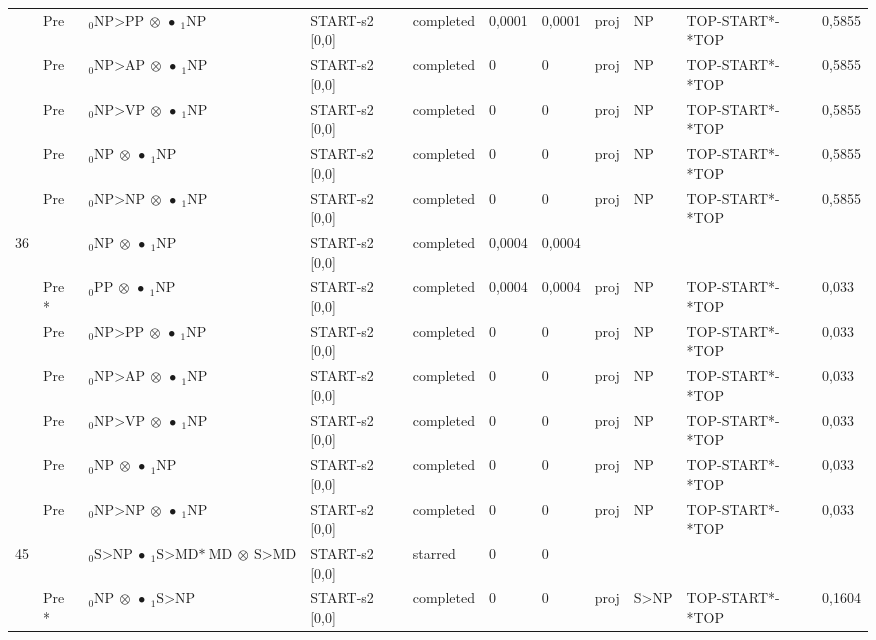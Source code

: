 \documentclass[10pt]{article}
\begin{document}
\begin{longtable}[htbp]{lllllllllll}
 & Pre & $ {}_0 \textrm{NP>PP} \  \otimes \  \bullet \ {}_{1} \textrm{NP} $ & START-s2 [0,0] & completed & 0,0001 & 0,0001 & proj & NP & TOP-START*-*TOP & 0,5855 \\ 
 & Pre & $ {}_0 \textrm{NP>AP} \  \otimes \  \bullet \ {}_{1} \textrm{NP} $ & START-s2 [0,0] & completed & 0 & 0 & proj & NP & TOP-START*-*TOP & 0,5855 \\ 
 & Pre & $ {}_0 \textrm{NP>VP} \  \otimes \  \bullet \ {}_{1} \textrm{NP} $ & START-s2 [0,0] & completed & 0 & 0 & proj & NP & TOP-START*-*TOP & 0,5855 \\ 
 & Pre & $ {}_0 \textrm{NP} \  \otimes \  \bullet \ {}_{1} \textrm{NP} $ & START-s2 [0,0] & completed & 0 & 0 & proj & NP & TOP-START*-*TOP & 0,5855 \\ 
 & Pre & $ {}_0 \textrm{NP>NP} \  \otimes \  \bullet \ {}_{1} \textrm{NP} $ & START-s2 [0,0] & completed & 0 & 0 & proj & NP & TOP-START*-*TOP & 0,5855 \\ 
36 & & $ {}_0 \textrm{NP} \  \otimes \  \bullet \ {}_{1} \textrm{NP} $ & START-s2 [0,0] & completed & 0,0004 & 0,0004 & & & & \\ 
 & Pre *& $ {}_0 \textrm{PP} \  \otimes \  \bullet \ {}_{1} \textrm{NP} $ & START-s2 [0,0] & completed & 0,0004 & 0,0004 & proj & NP & TOP-START*-*TOP & 0,033 \\ 
 & Pre & $ {}_0 \textrm{NP>PP} \  \otimes \  \bullet \ {}_{1} \textrm{NP} $ & START-s2 [0,0] & completed & 0 & 0 & proj & NP & TOP-START*-*TOP & 0,033 \\ 
 & Pre & $ {}_0 \textrm{NP>AP} \  \otimes \  \bullet \ {}_{1} \textrm{NP} $ & START-s2 [0,0] & completed & 0 & 0 & proj & NP & TOP-START*-*TOP & 0,033 \\ 
 & Pre & $ {}_0 \textrm{NP>VP} \  \otimes \  \bullet \ {}_{1} \textrm{NP} $ & START-s2 [0,0] & completed & 0 & 0 & proj & NP & TOP-START*-*TOP & 0,033 \\ 
 & Pre & $ {}_0 \textrm{NP} \  \otimes \  \bullet \ {}_{1} \textrm{NP} $ & START-s2 [0,0] & completed & 0 & 0 & proj & NP & TOP-START*-*TOP & 0,033 \\ 
 & Pre & $ {}_0 \textrm{NP>NP} \  \otimes \  \bullet \ {}_{1} \textrm{NP} $ & START-s2 [0,0] & completed & 0 & 0 & proj & NP & TOP-START*-*TOP & 0,033 \\ 
45 & & $ {}_0 \textrm{S>NP} \  \bullet \ {}_{1} \textrm{S>MD*} \ \textrm{MD} \  \otimes \ \textrm{S>MD} $ & START-s2 [0,0] & starred & 0 & 0 & & & & \\ 
 & Pre *& $ {}_0 \textrm{NP} \  \otimes \  \bullet \ {}_{1} \textrm{S>NP} $ & START-s2 [0,0] & completed & 0 & 0 & proj & S>NP & TOP-START*-*TOP & 0,1604 \\ 

\end{longtable}
\end{document}
